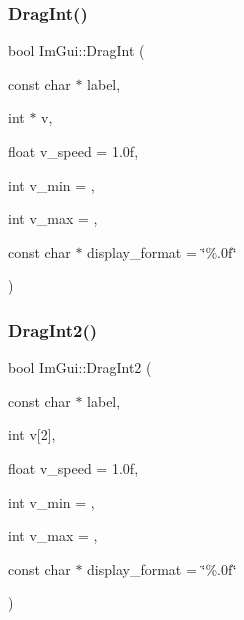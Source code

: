 \hypertarget{namespace_im_gui_abc3ac739a79de5897b61df4e6764fc9e}{}\label{namespace_im_gui_abc3ac739a79de5897b61df4e6764fc9e} 
\subsubsection{\texorpdfstring{Drag\+Int()}{DragInt()}}
{\footnotesize\ttfamily bool Im\+Gui\+::\+Drag\+Int (\begin{DoxyParamCaption}\item[{const char $\ast$}]{label,  }\item[{int $\ast$}]{v,  }\item[{float}]{v\+\_\+speed = {\ttfamily 1.0f},  }\item[{int}]{v\+\_\+min = {},  }\item[{int}]{v\+\_\+max = {},  }\item[{const char $\ast$}]{display\+\_\+format = {\ttfamily \char`\"{}\%.0f\char`\"{}} }\end{DoxyParamCaption})}

\hypertarget{namespace_im_gui_aa74f28deeb62f0aa96e1c34b27e7bcd9}{}\label{namespace_im_gui_aa74f28deeb62f0aa96e1c34b27e7bcd9} 
\subsubsection{\texorpdfstring{Drag\+Int2()}{DragInt2()}}
{\footnotesize\ttfamily bool Im\+Gui\+::\+Drag\+Int2 (\begin{DoxyParamCaption}\item[{const char $\ast$}]{label,  }\item[{int}]{v\mbox{[}2\mbox{]},  }\item[{float}]{v\+\_\+speed = {\ttfamily 1.0f},  }\item[{int}]{v\+\_\+min = {},  }\item[{int}]{v\+\_\+max = {},  }\item[{const char $\ast$}]{display\+\_\+format = {\ttfamily \char`\"{}\%.0f\char`\"{}} }\end{DoxyParamCaption})}

\hypertarget{namespace_im_gui_ab0b40f3d0631113d54fa8e0c90ed4f77}{}\label{namespace_im_gui_ab0b40f3d0631113d54fa8e0c90ed4f77} 
